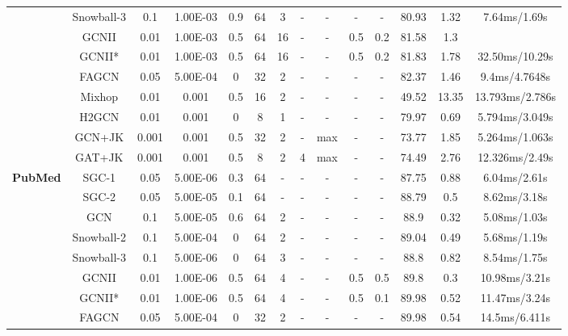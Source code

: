 \documentclass{article}
\newcommand{\0}{{\boldsymbol{0}}}
\newcommand{\6}{{\partial}}
\newcommand{\8}{{\infty}}
\newcommand{\4}{{\nabla}}
\begin{document}
\begin{table}[htbp]
{\begin{tabular}{c|c|cccccccccccc}
          & Snowball-3 & 0.1   & 1.00E-03 & 0.9   & 64    & 3     & -     & -     & -     & -     & 80.93 & 1.32  & 7.64ms/1.69s \\
          & GCNII & 0.01  & 1.00E-03 & 0.5   & 64    & 16    & -     & -     & 0.5   & 0.2   & 81.58 & 1.3   &  \\
          & GCNII* & 0.01  & 1.00E-03 & 0.5   & 64    & 16    & -     & -     & 0.5   & 0.2   & 81.83 & 1.78  & 32.50ms/10.29s \\
          & FAGCN & 0.05  & 5.00E-04 & 0     & 32    & 2     & -     & -     & -     & -     & 82.37 & 1.46  & 9.4ms/4.7648s \\
          &  Mixhop & 0.01  & 0.001 & 0.5   & 16    & 2     & - & - & - & - & 49.52 & 13.35 & {13.793ms/2.786s} \\
          & H2GCN & 0.01  & 0.001 & 0     & 8     & 1     & - & - & - & - & 79.97 & 0.69  & {5.794ms/3.049s} \\
          & GCN+JK & 0.001 & 0.001 & 0.5   & 32    & 2     & - & {max} & - & - & 73.77 & 1.85  & {5.264ms/1.063s} \\
          &  GAT+JK & 0.001 & 0.001 & 0.5   & 8     & 2     & 4     & {max} & - & - & 74.49 & 2.76  & {12.326ms/2.49s} \\
          \midrule
    \multirow{12}[0]{*}{\textbf{PubMed}} & SGC-1 & 0.05  & 5.00E-06 & 0.3   & 64    & -     & -     & -     & -     & -     & 87.75 & 0.88  & 6.04ms/2.61s \\
          & SGC-2 & 0.05  & 5.00E-05 & 0.1   & 64    & -     & -     & -     & -     & -     & 88.79 & 0.5   & 8.62ms/3.18s \\
          & GCN   & 0.1   & 5.00E-05 & 0.6   & 64    & 2     & -     & -     & -     & -     & 88.9  & 0.32  & 5.08ms/1.03s \\
          & Snowball-2 & 0.1   & 5.00E-04 & 0     & 64    & 2     & -     & -     & -     & -     & 89.04 & 0.49  & 5.68ms/1.19s \\
          & Snowball-3 & 0.1   & 5.00E-06 & 0     & 64    & 3     & -     & -     & -     & -     & 88.8  & 0.82  & 8.54ms/1.75s \\
          & GCNII & 0.01  & 1.00E-06 & 0.5   & 64    & 4     & -     & -     & 0.5   & 0.5   & 89.8  & 0.3   & 10.98ms/3.21s \\
          & GCNII* & 0.01  & 1.00E-06 & 0.5   & 64    & 4     & -     & -     & 0.5   & 0.1   & 89.98 & 0.52  & 11.47ms/3.24s \\
          & FAGCN & 0.05  & 5.00E-04 & 0     & 32    & 2     & -     & -     & -     & -     & 89.98 & 0.54  & 14.5ms/6.411s \\

\end{tabular}}
\end{table}
\end{document}
